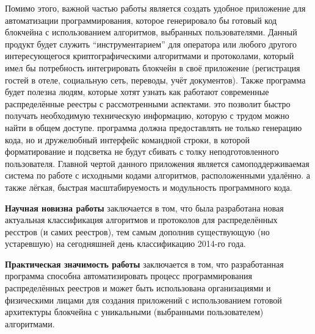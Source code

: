 Помимо этого, важной частью работы является создать удобное приложение для
автоматизации программирования, которое генерировало бы готовый код блокчейна с
использованием алгоритмов, выбранных пользователями. Данный продукт будет
служить ``инструментарием'' для оператора или любого другого интересующегося
криптографическими алгоритмами и протоколами, который имел бы потребность
интегрировать блокчейн в своё приложение (регистрация гостей в отеле,
социальную сеть, переводы, учёт документов). Также программа будет полезна
людям, которые хотят узнать как работают современные распределённые реестры с
рассмотренными аспектами. это позволит быстро получать необходимую техническую
информацию, которую с трудом можно найти в общем доступе. программа должна
предоставлять не только генерацию кода, но и дружелюбный интерфейс командной
строки, в которой форматирование и подсветка не будут сбивать с толку
неподготовленного пользователя.
Главной чертой данного приложения является самоподдерживаемая система по работе
с исходными кодами алгоритмов, расположенными удалённо. а также лёгкая,
быстрая масштабируемость и модульность программного кода.

\textbf{Научная новизна работы} заключается в том, что была разработана новая
актуальная классификация алгоритмов и протоколов для распределённых ресстров (и
самих реестров), тем самым дополнив существующую (но устаревшую) на сегодняшней
день классификацию 2014-го года.

\textbf{Практическая значимость работы} заключается в том, что разработанная
программа способна автоматизировать процесс программирования распределённых
реестров и может быть использована организациями и физическими лицами для
создания приложений с использованием готовой архитектуры блокчейна с
уникальными (выбранными пользователем) алгоритмами.
